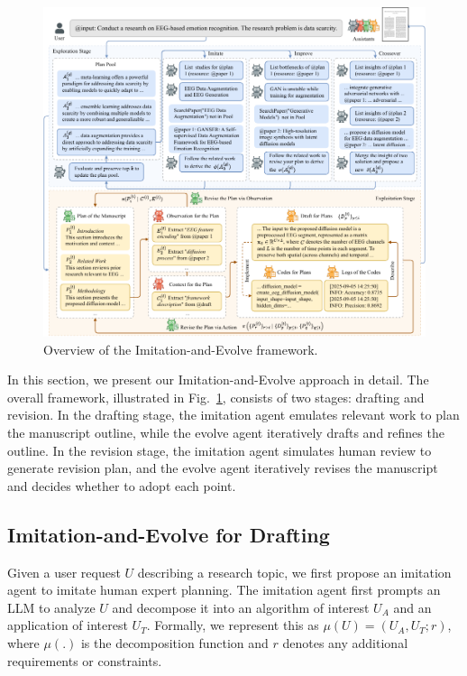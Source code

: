 \documentclass[manuscript,review,anonymous]{acmart}
\begin{document}
\begin{figure}[h]
  \begin{center}
      \includegraphics[width=\linewidth]{./framework.pdf}
  \end{center}
  \caption{Overview of the Imitation-and-Evolve framework.}
  \label{fig:framework}
\end{figure}

In this section, we present our Imitation-and-Evolve approach in detail. The overall framework, illustrated in Fig.~\ref{fig:framework}, consists of two stages: drafting and revision. In the drafting stage, the imitation agent emulates relevant work to plan the manuscript outline, while the evolve agent iteratively drafts and refines the outline. In the revision stage, the imitation agent simulates human review to generate revision plan, and the evolve agent iteratively revises the manuscript and decides whether to adopt each point.

\subsection{Imitation-and-Evolve for Drafting}

Given a user request $U$ describing a research topic, we first propose an imitation agent to imitate human expert planning. The imitation agent first prompts an LLM to analyze $U$ and decompose it into an algorithm of interest $U_A$ and an application of interest $U_T$. Formally, we represent this as $\mu(U) = (U_A, U_T; r)$, where $\mu(.)$ is the decomposition function and $r$ denotes any additional requirements or constraints.
\end{document}
